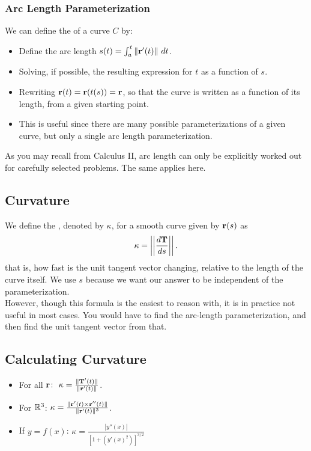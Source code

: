 \subsubsection{Arc Length Parameterization} 

We can define the  of a curve \(C\) by:
\begin{itemize}
    \item Define the arc length \(s(t) = \int_{a}^{t}\|\mathbf{r}'(t)\|\ dt\).
    \item Solving, if possible, the resulting expression for \(t\) as a function of \(s\).
    \item Rewriting \(\mathbf{r}(t) = \mathbf{r}(t(s)) = \mathbf{r}\), so that the curve is written as a function of its length, from a given starting point.
    \item This is useful since there are many possible parameterizations of a given curve, but only a single arc length parameterization.
\end{itemize}
As you may recall from Calculus II, arc length can only be explicitly worked out for carefully selected problems. The same applies here.

\subsection{Curvature}

We define the , denoted by \(\kappa\), for a smooth curve given by \(\mathbf{r}(s)\) as 
\[
    \kappa = \left|\left|\frac{d\mathbf{T}}{ds}\right|\right|.
\]
that is, how fast is the unit tangent vector changing, relative to the length of the curve itself. We use \(s\) because we want our answer to be independent of the parameterization. \\

However, though this formula is the easiest to reason with, it is in practice not useful in most cases. You would have to find the arc-length parameterization, and then find the unit tangent vector from that.  

\subsection{Calculating Curvature}

\begin{itemize}
    \item For all \(\mathbf{r} \colon \ \kappa = \frac{\|\mathbf{T}'(t)\|}{\|\mathbf{r}'(t)\|}\).
    \item For \(\mathbb{R}^{3}\): \(\kappa = \frac{\|\mathbf{r}'(t) \times \mathbf{r}''(t)\|}{\|\mathbf{r}'(t)\|^{3}}\).
    \item If \(y = f(x)\): \(\kappa = \frac{|y''(x)|}{[1 + (y'(x)^{2})]^{3/2}}\)
\end{itemize}

